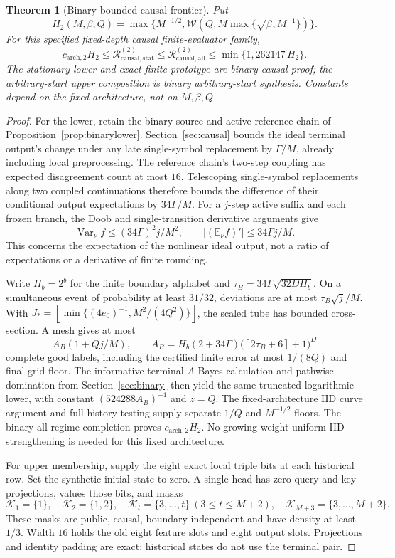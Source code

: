 \documentclass[11pt,letterpaper]{article}
\newtheorem{theorem}{Theorem}[section]
\theoremstyle{definition}\newtheorem{definition}[theorem]{Definition}
\theoremstyle{remark}\newtheorem{remark}[theorem]{Remark}
\newcommand{\E}{\mathbb{E}}
\newcommand{\Var}{\operatorname{Var}}
\newcommand{\floor}[1]{\left\lfloor #1\right\rfloor}
\newcommand{\ceil}[1]{\left\lceil #1\right\rceil}
\newcommand{\Risk}{\mathcal{R}}
\begin{document}
\begin{theorem}[Binary bounded causal frontier]\label{thm:binarycausal}
Put
\[
 H_2(M,\beta,Q)=
 \max\{M^{-1/2},\mathcal W(Q,M\max\{\sqrt\beta,M^{-1}\})\}.
\]
For this specified fixed-depth causal finite-evaluator family,
\[
 c_{\mathrm{arch},2}H_2
 \le\Risk_{\mathrm{causal},\mathrm{stat}}^{(2)}
 \le\Risk_{\mathrm{causal},\mathrm{all}}^{(2)}
 \le\min\{1,262147\,H_2\}.
\]
The stationary lower and exact finite prototype are binary causal proof; the arbitrary-start upper composition is binary arbitrary-start synthesis. Constants depend on the fixed architecture, not on $M,\beta,Q$.
\end{theorem}
\begin{proof}
For the lower, retain the binary source and active reference chain of Proposition~\ref{prop:binarylower}. Section~\ref{sec:causal} bounds the ideal terminal output's change under any late single-symbol replacement by $\Gamma/M$, already including local preprocessing. The reference chain's two-step coupling has expected disagreement count at most $16$. Telescoping single-symbol replacements along two coupled continuations therefore bounds the difference of their conditional output expectations by $34\Gamma/M$. For a $j$-step active suffix and each frozen branch, the Doob and single-transition derivative arguments give
\[
 \Var_\nu f\le(34\Gamma)^2j/M^2,\qquad
 |(\E_\nu f)'|\le34\Gamma j/M.
\]
This concerns the expectation of the nonlinear ideal output, not a ratio of expectations or a derivative of finite rounding.

Write $H_b=2^b$ for the finite boundary alphabet and
$\tau_B=34\Gamma\sqrt{32DH_b}$. On a simultaneous event of probability at least $31/32$, deviations are at most $\tau_B\sqrt j/M$. With
$J_*=\floor{\min\{(4e_0)^{-1},M^2/(4Q^2)\}}$,
the scaled tube has bounded cross-section. A mesh gives at most
\[
 A_B(1+Qj/M),\qquad
 A_B=H_b(2+34\Gamma)
      \bigl(\ceil{2\tau_B+6}+1\bigr)^D
\]
complete good labels, including the certified finite error at most $1/(8Q)$ and final grid floor. The informative-terminal-$A$ Bayes calculation and pathwise domination from Section~\ref{sec:binary} then yield the same truncated logarithmic lower, with constant $(524288A_B)^{-1}$ and $z=Q$.
The fixed-architecture IID curve argument and full-history testing supply separate $1/Q$ and $M^{-1/2}$ floors. The binary all-regime completion proves $c_{\mathrm{arch},2}H_2$. No growing-weight uniform IID strengthening is needed for this fixed architecture.

For upper membership, supply the eight exact local triple bits at each historical row. Set the synthetic initial state to zero. A single head has zero query and key projections, values those bits, and masks
\[
 \mathcal K_1=\{1\},\quad \mathcal K_2=\{1,2\},\quad
 \mathcal K_t=\{3,\ldots,t\}\ (3\le t\le M+2),\quad
 \mathcal K_{M+3}=\{3,\ldots,M+2\}.
\]
These masks are public, causal, boundary-independent and have density at least $1/3$. Width $16$ holds the old eight feature slots and eight output slots. Projections and identity padding are exact; historical states do not use the terminal pair.


\end{proof}
\end{document}
